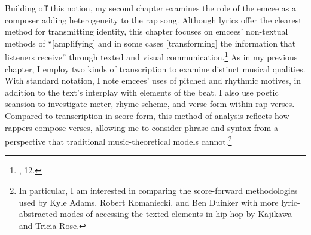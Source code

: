 Building off this notion, my second chapter examines the role of the emcee as a composer 
adding heterogeneity to the rap song. Although lyrics offer the clearest method for transmitting 
identity, this chapter focuses on emcees' non-textual methods of ``[amplifying] and in some cases
[transforming] the information that listeners receive'' through texted and visual
communication.\footnote{\cite{lorenkajikawaSoundingRaceRap2015}, 12.} As in my previous chapter, I 
employ two kinds of transcription to examine distinct musical qualities. With standard notation, I 
note emcees' uses of pitched and rhythmic motives, in addition to the text's interplay with elements 
of the beat. I also use poetic scansion to investigate meter, rhyme scheme, and verse form within 
rap verses. Compared to transcription in score form, this method of analysis reflects how rappers 
compose verses, allowing me to consider phrase and syntax from a perspective that traditional 
music-theoretical models cannot.\footnote{In particular, I am interested in comparing the score-forward
methodologies used by Kyle Adams, Robert Komaniecki, and Ben Duinker with more lyric-abstracted 
modes of accessing the texted elements in hip-hop by Kajikawa and Tricia Rose.}
